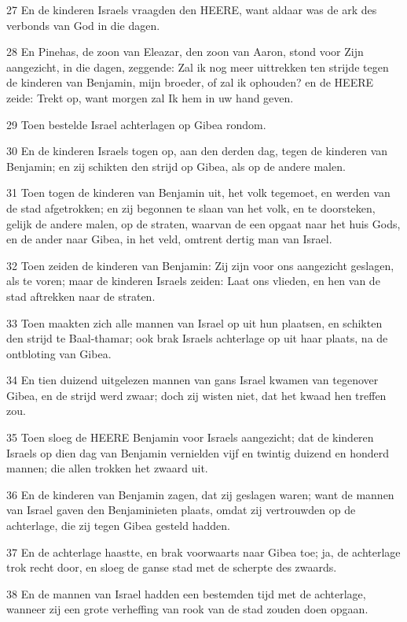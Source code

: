 \par 27 En de kinderen Israels vraagden den HEERE, want aldaar was de ark des verbonds van God in die dagen.
\par 28 En Pinehas, de zoon van Eleazar, den zoon van Aaron, stond voor Zijn aangezicht, in die dagen, zeggende: Zal ik nog meer uittrekken ten strijde tegen de kinderen van Benjamin, mijn broeder, of zal ik ophouden? en de HEERE zeide: Trekt op, want morgen zal Ik hem in uw hand geven.
\par 29 Toen bestelde Israel achterlagen op Gibea rondom.
\par 30 En de kinderen Israels togen op, aan den derden dag, tegen de kinderen van Benjamin; en zij schikten den strijd op Gibea, als op de andere malen.
\par 31 Toen togen de kinderen van Benjamin uit, het volk tegemoet, en werden van de stad afgetrokken; en zij begonnen te slaan van het volk, en te doorsteken, gelijk de andere malen, op de straten, waarvan de een opgaat naar het huis Gods, en de ander naar Gibea, in het veld, omtrent dertig man van Israel.
\par 32 Toen zeiden de kinderen van Benjamin: Zij zijn voor ons aangezicht geslagen, als te voren; maar de kinderen Israels zeiden: Laat ons vlieden, en hen van de stad aftrekken naar de straten.
\par 33 Toen maakten zich alle mannen van Israel op uit hun plaatsen, en schikten den strijd te Baal-thamar; ook brak Israels achterlage op uit haar plaats, na de ontbloting van Gibea.
\par 34 En tien duizend uitgelezen mannen van gans Israel kwamen van tegenover Gibea, en de strijd werd zwaar; doch zij wisten niet, dat het kwaad hen treffen zou.
\par 35 Toen sloeg de HEERE Benjamin voor Israels aangezicht; dat de kinderen Israels op dien dag van Benjamin vernielden vijf en twintig duizend en honderd mannen; die allen trokken het zwaard uit.
\par 36 En de kinderen van Benjamin zagen, dat zij geslagen waren; want de mannen van Israel gaven den Benjaminieten plaats, omdat zij vertrouwden op de achterlage, die zij tegen Gibea gesteld hadden.
\par 37 En de achterlage haastte, en brak voorwaarts naar Gibea toe; ja, de achterlage trok recht door, en sloeg de ganse stad met de scherpte des zwaards.
\par 38 En de mannen van Israel hadden een bestemden tijd met de achterlage, wanneer zij een grote verheffing van rook van de stad zouden doen opgaan.
